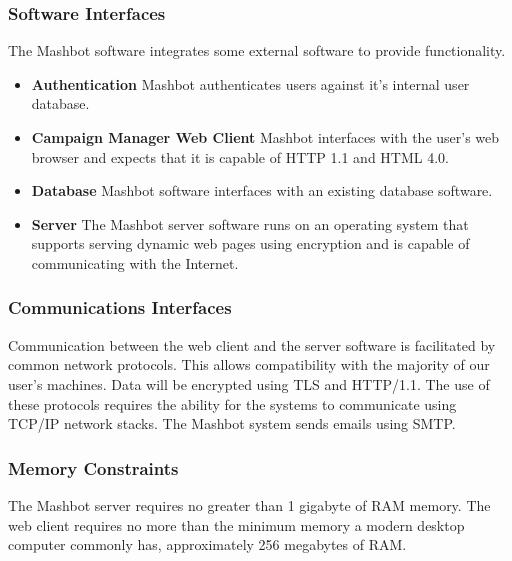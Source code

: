\documentclass{report}
\begin{document}
		\subsubsection{Software Interfaces} %
                The Mashbot software integrates some external software
                to provide functionality.
                \begin{itemize}
                \item \textbf{Authentication} Mashbot authenticates users
                  against it's internal user database.
                \item \textbf{Campaign Manager Web Client} Mashbot
                  interfaces with the user’s web browser and expects
                  that it is capable of HTTP 1.1 and HTML 4.0.
                \item \textbf{Database} Mashbot software interfaces
                  with an existing database software.
                \item \textbf{Server} The Mashbot server software runs
                  on an operating system that supports serving dynamic
                  web pages using encryption and is capable of
                  communicating with the Internet.
                \end{itemize}
		\subsubsection{Communications Interfaces} %
                   Communication between the web client and the
                   server software is facilitated by common network
                   protocols. This allows compatibility with the
                   majority of our user's machines.  Data will
                   be encrypted using TLS and HTTP/1.1. The use of
                   these protocols requires the ability for the
                   systems to communicate using TCP/IP network stacks.
                   The Mashbot system sends emails using SMTP.

		\subsubsection{Memory Constraints} %
                The Mashbot server requires no greater than 1 gigabyte
                of RAM memory. The web client requires no more than
                the minimum memory a modern desktop computer commonly
                has, approximately 256 megabytes of RAM.
\end{document}
